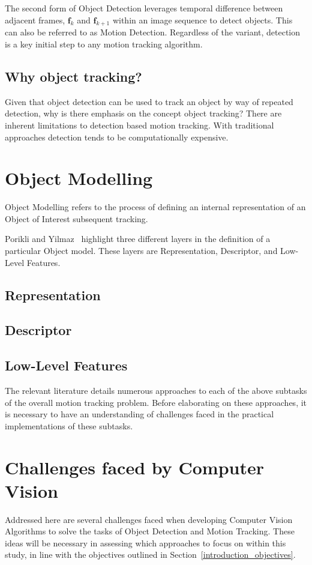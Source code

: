 The second form of Object Detection leverages temporal difference
between adjacent frames, $\mathbf{f}_k$ and $\mathbf{f}_{k+1}$ within an image
sequence to detect objects. This can also be referred to as Motion Detection.  
Regardless of the variant, detection is a key initial step to any motion
tracking algorithm.

\subsection{Why object tracking?}
Given that object detection can be used to track an object by way of repeated
detection, why is there emphasis on the concept object tracking?
There are inherent limitations to detection based motion tracking. With
traditional approaches detection tends to be computationally expensive. 


\section{Object Modelling}
Object Modelling refers to the process of defining an internal representation of
an Object of Interest subsequent tracking.

Porikli and Yilmaz~\cite{Porikli2012} highlight three different layers in the
definition of a particular Object model. These layers are Representation,
Descriptor, and Low-Level Features.

\subsection{Representation}

\subsection{Descriptor}

\subsection{Low-Level Features}



The relevant literature details numerous approaches to each of the above
subtasks of the overall motion tracking problem. Before elaborating on these
approaches, it is necessary to have an understanding of challenges faced in
the practical implementations of these subtasks.

\section{Challenges faced by Computer Vision}\label{literature_review_challenges}
Addressed here are several challenges faced when developing Computer
Vision Algorithms to solve the tasks of Object Detection and Motion Tracking. 
These ideas will be necessary in assessing which approaches to focus on within
this study, in line with the objectives outlined in Section~\ref{introduction_objectives}.

